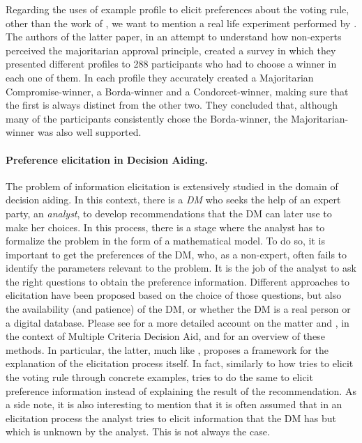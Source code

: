 Regarding the uses of example profile to elicit preferences about the voting rule, other than the work of \citet{Cailloux2014}, we want to mention a real life experiment performed by \citet{Giritligil2005}. The authors of the latter paper, in an attempt to understand how non-experts perceived the majoritarian approval principle, created a survey in which they presented different profiles to 288 participants who had to choose a winner in each one of them. In each profile they accurately created a Majoritarian Compromise-winner, a Borda-winner and a Condorcet-winner, making sure that the first is always distinct from the other two. They concluded that, although many of the participants consistently chose the Borda-winner, the Majoritarian-winner was also well supported.

\paragraph{Preference elicitation in Decision Aiding.}
The problem of information elicitation is extensively studied in the domain of decision aiding. In this context, there is a \textit{\ac{DM}} who seeks the help of an expert party, an \textit{analyst}, to develop recommendations that the \ac{DM} can later use to make her choices. In this process, there is a stage where the analyst has to formalize the problem in the form of a mathematical model. To do so, it is important to get the preferences of the \ac{DM}, who, as a non-expert, often fails to identify the parameters relevant to the problem. It is the job of the analyst to ask the right questions to obtain the preference information.
Different approaches to elicitation have been proposed based on the choice of those questions, but also the availability (and patience) of the \ac{DM}, or whether the \ac{DM} is a real person or a digital database.
Please see \citet{Bouyssou2006} for a more detailed account on the matter and \citet{Mousseau2005}, in the context of Multiple Criteria Decision Aid, and \citet{Belahcene2018} for an overview of these methods. In particular, the latter, much like \citet{Cailloux2014}, proposes a framework for the explanation of the elicitation process itself. In fact, similarly to how \citet{Cailloux2014} tries to elicit the voting rule through concrete examples, \citet{Belahcene2018} tries to do the same to elicit preference information instead of explaining the result of the recommendation.
As a side note, it is also interesting to mention that it is often assumed that in an elicitation process the analyst tries to elicit information that the \ac{DM} has but which is unknown by the analyst. This is not always the case. 
